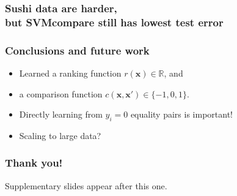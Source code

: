 \documentclass{beamer}
\newcommand{\RR}{\mathbb R}
\begin{document}
\begin{frame}
  \frametitle{Sushi data are harder,\\
    but SVMcompare still has lowest test error}
  \begin{minipage}{1.0\linewidth}
    \hskip -1cm
      
  \end{minipage}
\end{frame}

\begin{frame}
  \frametitle{Conclusions and future work}
  \begin{itemize}
  \item Learned a ranking function $r(\mathbf x)\in\RR$, and
  \item a comparison function $c(\mathbf x, \mathbf x')\in\{-1,0,1\}$.
  \item Directly learning from $y_i=0$ equality pairs is important!
  \item Scaling to large data?
  \end{itemize}
\end{frame}

\begin{frame}
  \frametitle{Thank you!}
  Supplementary slides appear after this one.
\end{frame}
\end{document}

